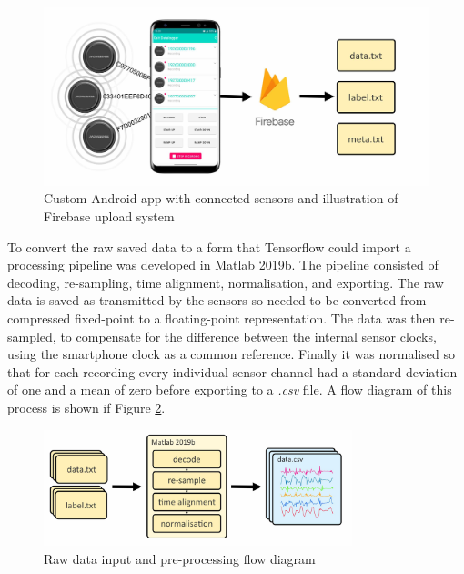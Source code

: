 \documentclass[sensors,article,submit,moreauthors,pdftex]{Definitions/mdpi}
\begin{document}
\begin{figure}[!hbt]
    \centering
    \includegraphics[width=\textwidth]{Figures/movesense/sensor_collection.jpg}
    \caption{Custom Android app with connected sensors and illustration of Firebase upload system}
    \label{subfig:data_collection}
    \label{fig:data_collection_diagrams}
\end{figure}

To convert the raw saved data to a form that Tensorflow could import a processing pipeline was developed in Matlab 2019b. The pipeline consisted of decoding, re-sampling, time alignment, normalisation, and exporting. The raw data is saved as transmitted by the sensors so needed to be converted from compressed fixed-point to a floating-point representation. The data was then re-sampled, to compensate for the difference between the internal sensor clocks, using the smartphone clock as a common reference. Finally it was normalised so that for each recording every individual sensor channel had a standard deviation of one and a mean of zero before exporting to a \textit{.csv} file. A flow diagram of this process is shown if Figure \ref{fig:data_processing}.

\begin{figure}[!hbt]
    \centering
    \includegraphics[width=0.8\textwidth]{Figures/movesense/data_processing.jpg}
    \caption{Raw data input and pre-processing flow diagram}
    \label{fig:data_processing}
\end{figure}
\end{document}
